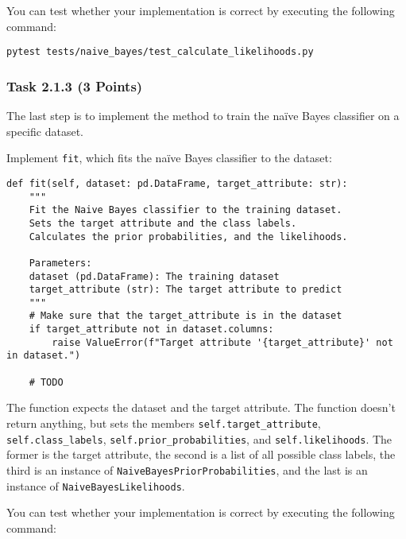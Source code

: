 \documentclass[
english,
smallborders
]{i6prcsht}
\newcommand{\points}[1]{\hfill \color{red}(#1 Points)\color{black}}
\begin{document}
You can test whether your implementation is correct by executing the following command:

\vspace*{0.3cm}

\begin{lstlisting}
pytest tests/naive_bayes/test_calculate_likelihoods.py
\end{lstlisting}

\vspace*{0.1cm}

\subsubsection*{Task 2.1.3 \points{3}}

The last step is to implement the method to train the naïve Bayes classifier on a specific dataset.

Implement \texttt{fit}, which fits the naïve Bayes classifier to the dataset:

\vspace*{0.3cm}

\begin{lstlisting}
def fit(self, dataset: pd.DataFrame, target_attribute: str):
	"""
	Fit the Naive Bayes classifier to the training dataset.
	Sets the target attribute and the class labels.
	Calculates the prior probabilities, and the likelihoods.

	Parameters:
	dataset (pd.DataFrame): The training dataset
	target_attribute (str): The target attribute to predict
	"""
	# Make sure that the target_attribute is in the dataset
	if target_attribute not in dataset.columns:
		raise ValueError(f"Target attribute '{target_attribute}' not in dataset.")

	# TODO
\end{lstlisting}

\vspace*{0.1cm}

The function expects the dataset and the target attribute. The function doesn't return anything, but sets the members \texttt{self.target\_attribute}, \texttt{self.class\_labels}, \texttt{self.prior\_probabilities}, and \texttt{self.likelihoods}. The former is the target attribute, the second is a list of all possible class labels, the third is an instance of \texttt{NaiveBayesPriorProbabilities}, and the last is an instance of \texttt{NaiveBayesLikelihoods}.

You can test whether your implementation is correct by executing the following command:
\end{document}
